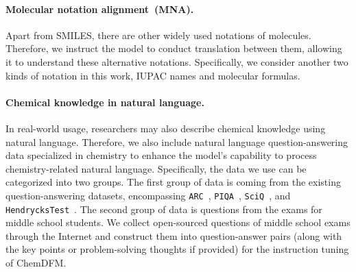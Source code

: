 \paragraph{Molecular notation alignment~(MNA).} Apart from SMILES, there are other widely used notations of molecules. Therefore, we instruct the model to conduct translation between them, allowing it to understand these alternative notations. Specifically, we consider another two kinds of notation in this work, IUPAC names and molecular formulas.

\paragraph{Chemical knowledge in natural language.} In real-world usage, researchers may also describe chemical knowledge using natural language.
Therefore, we also include natural language question-answering data specialized in chemistry to enhance the model's capability to process chemistry-related natural language.
Specifically, the data we use can be categorized into two groups. The first group of data is coming from the existing question-answering datasets, encompassing {\tt ARC}~\cite{clark2018think}, {\tt PIQA}~\cite{bisk2020piqa}, {\tt SciQ}~\cite{welbl2017crowdsourcing}, and {\tt HendrycksTest}~\cite{hendryckstest2021}. The second group of data is questions from the exams for middle school students. We collect open-sourced questions of middle school exams through the Internet and construct them into question-answer pairs (along with the key points or problem-solving thoughts if provided) for the instruction tuning of ChemDFM.

